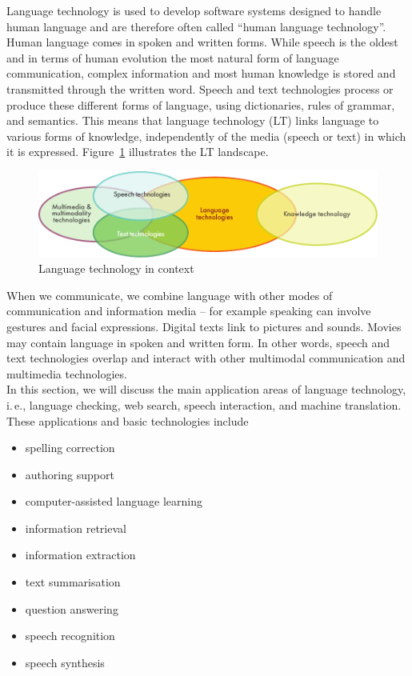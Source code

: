 \documentclass[]{../../metanetpaper}
\begin{document}
\clearpage


\begin{multicols}{2}

Language technology is used to develop software systems designed to handle human language and are therefore often called “human language technology”. Human language comes in spoken and written forms. While speech is the oldest and in terms of human evolution the most natural form of language communication, complex information and most human knowledge is stored and transmitted through the written word. Speech and text technologies process or produce these different forms of language, using dictionaries, rules of grammar, and semantics. This means that language technology (LT) links language to various forms of knowledge, independently of the media (speech or text) in which it is expressed. Figure~\ref{fig:ltincontext_en} illustrates the LT landscape.

\begin{figure}[htb]
  \center
  \includegraphics[width=\textwidth]{../_media/english/language_technologies}
  \caption{Language technology in context}
  \label{fig:ltincontext_en}
\end{figure}

When we communicate, we combine language with other modes of communication and information media – for example speaking can involve gestures and facial expressions. Digital texts link to pictures and sounds. Movies may contain language in spoken and written form. In other words, speech and text technologies overlap and interact with other multimodal communication and multimedia technologies.\\ 
In this section, we will discuss the main application areas of language technology, i.\,e., language checking, web search, speech interaction, and machine translation. These applications and basic technologies include 

\begin{itemize}
\item spelling correction
\item authoring support
\item computer-assisted language learning
\item information retrieval 
\item information extraction
\item text summarisation
\item question answering
\item speech recognition 
\item speech synthesis 
\end{itemize}


\end{multicols}
\end{document}

